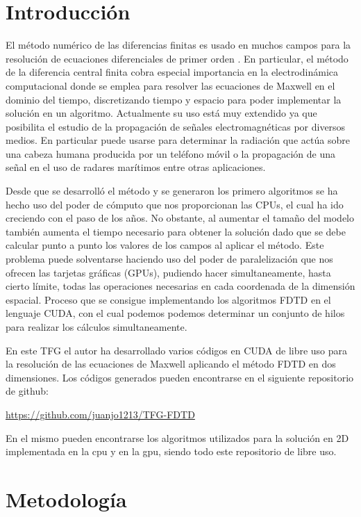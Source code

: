 \documentclass[11pt,a4paper,twoside,pdf]{article}
\numberwithin{equation}{section}
\begin{document}
\pagestyle{fancy}
\fancyhead[RO,LE]{\leftmark}
\fancyhead[LO,RE]{\thepage}
\fancyfoot{}

\section{Introducción}
El método numérico de las diferencias finitas es usado en muchos campos para la resolución de ecuaciones diferenciales de primer orden \cite{Taflove2005}. En particular, el método de la diferencia central finita cobra especial importancia en la electrodinámica computacional donde se emplea para resolver las ecuaciones de Maxwell en el dominio del tiempo, discretizando tiempo y espacio para poder implementar la solución en un algoritmo.
Actualmente su uso está muy extendido ya que posibilita el estudio de la propagación de señales electromagnéticas por diversos medios. En particular puede usarse para determinar la radiación que actúa sobre una cabeza humana producida por un teléfono móvil o la propagación de una señal en el uso de radares marítimos entre otras aplicaciones.

Desde que se desarrolló el método y se generaron los primero algoritmos se ha hecho uso del poder de cómputo que nos proporcionan las CPUs, el cual ha ido creciendo con el paso de los años. No obstante, al aumentar el tamaño del modelo también aumenta el tiempo necesario para obtener la solución dado que se debe calcular punto a punto los valores de los campos al aplicar el método. Este problema puede solventarse haciendo uso del poder de paralelización que nos ofrecen las tarjetas gráficas (GPUs), pudiendo hacer simultaneamente, hasta cierto límite, todas las operaciones necesarias en cada coordenada de la dimensión espacial. Proceso que se consigue implementando los algoritmos FDTD en el lenguaje CUDA, con el cual podemos podemos determinar un conjunto de hilos para realizar los cálculos simultaneamente.

En este TFG el autor ha desarrollado varios códigos en CUDA de libre uso para la resolución de las ecuaciones de Maxwell aplicando el método FDTD en dos dimensiones. Los códigos generados pueden encontrarse en el siguiente repositorio de github:

\url{https://github.com/juanjo1213/TFG-FDTD}

En el mismo pueden encontrarse los algoritmos utilizados para la solución en 2D implementada en la cpu y en la gpu, siendo todo este repositorio de libre uso.


\section{Metodología}
\end{document}
